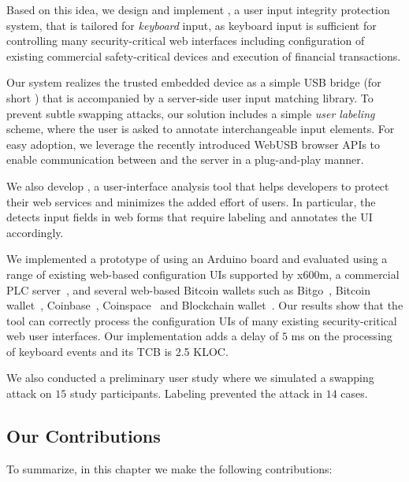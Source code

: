  Based on this idea, we design and implement \name, a user input integrity protection system, that is tailored for \emph{keyboard} input, as keyboard input is sufficient for controlling many security-critical web interfaces including configuration of existing commercial safety-critical devices and execution of financial transactions.

Our system realizes the trusted embedded device as a simple USB bridge (for short \device) that is accompanied by a server-side user input matching library. To prevent subtle swapping attacks, our solution includes a simple \emph{user labeling} scheme, where the user is asked to annotate interchangeable input elements. For easy adoption, we leverage the recently introduced WebUSB browser APIs to enable communication between \device and the server in a plug-and-play manner. 

We also develop \tool, a user-interface analysis tool that helps developers to protect their web services and minimizes the added effort of users. In particular, the \tool detects input fields in web forms that require labeling and annotates the UI accordingly. 

We implemented a prototype of \device using an Arduino board and evaluated \tool using a range of existing web-based configuration UIs supported by x600m, a commercial PLC server~\cite{controlbyweb}, and several web-based Bitcoin wallets such as Bitgo~\cite{bitgo}, Bitcoin wallet~\cite{bitcoinwallet}, Coinbase~\cite{coinbase}, Coinspace~\cite{coin} and Blockchain wallet~\cite{blockchain}. Our results show that the tool can correctly process the configuration UIs of many existing security-critical web user interfaces. Our \device implementation adds a delay of $5$ ms on the processing of keyboard events and its TCB is 2.5 KLOC. 

We also conducted a preliminary user study where we simulated a swapping attack on $15$ study participants. Labeling prevented the attack in $14$ cases.


\subsection{Our Contributions} To summarize, in this chapter we make the following contributions:


